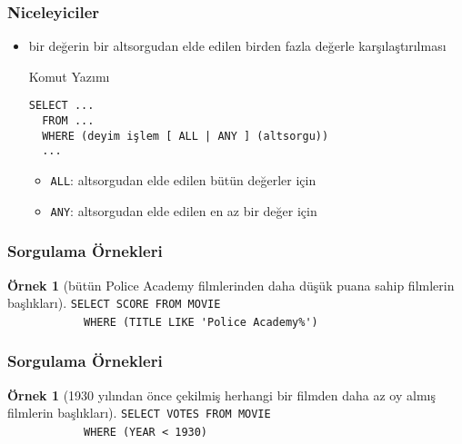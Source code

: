 \documentclass[dvipsnames]{beamer}
\theoremstyle{definition}
\theoremstyle{example}
\newtheorem{ornek}[theorem]{Örnek}
\theoremstyle{plain}
\begin{document}
\begin{frame}[fragile]
  \frametitle{Niceleyiciler}

  \begin{itemize}
    \item bir değerin bir altsorgudan elde edilen birden fazla değerle
      karşılaştırılması

    \begin{block}{Komut Yazımı}
      \begin{lstlisting}
SELECT ...
  FROM ...
  WHERE (deyim işlem [ ALL | ANY ] (altsorgu))
  ...
      \end{lstlisting}
    \end{block}

    \pause
    \begin{itemize}
      \item \lstinline!ALL!: altsorgudan elde edilen bütün değerler için
      \item \lstinline!ANY!: altsorgudan elde edilen en az bir değer için
    \end{itemize}
  \end{itemize}
\end{frame}

\begin{frame}[fragile]
  \frametitle{Sorgulama Örnekleri}

  \begin{ornek}[bütün Police Academy filmlerinden daha düşük puana sahip
                filmlerin başlıkları]
\lstinline!SELECT SCORE FROM MOVIE!\\
~~~~~~~~~~~~\lstinline!WHERE (TITLE LIKE 'Police Academy%')!
  \end{ornek}
\end{frame}

\begin{frame}[fragile]
  \frametitle{Sorgulama Örnekleri}

  \begin{ornek}[1930 yılından önce çekilmiş herhangi bir filmden daha az oy
                almış filmlerin başlıkları]
\lstinline!SELECT VOTES FROM MOVIE!\\
~~~~~~~~~~~~\lstinline!WHERE (YEAR < 1930)!
  \end{ornek}
\end{frame}
\end{document}
